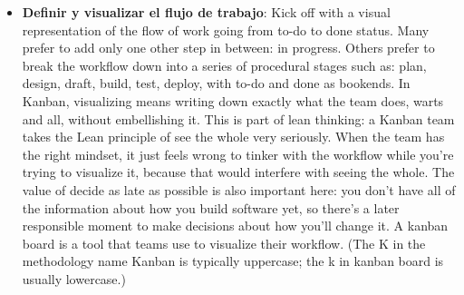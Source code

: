 \begin{itemize}
    \item \textbf{Definir y visualizar el flujo de trabajo}: %
    Kick off with a visual representation
    of the flow of work going from to-do to done status. Many
    prefer to add only one other step in between: in progress.
    Others prefer to break the workflow down into a series of
    procedural stages such as: plan, design, draft, build, test,
    deploy, with to-do and done as bookends.
    In Kanban, visualizing means writing down exactly what the team does, warts and all,
without embellishing it. This is part of lean thinking: a Kanban team takes the Lean
principle of see the whole very seriously. When the team has the right mindset, it just
feels wrong to tinker with the workflow while you're trying to visualize it, because that
would interfere with seeing the whole. The value of decide as late as possible is also
important here: you don't have all of the information about how you build software
yet, so there's a later responsible moment to make decisions about how you'll
change it. A kanban board is a tool that teams use to visualize their workflow. (The K in the
methodology name Kanban is typically uppercase; the k in kanban board is usually
lowercase.)


\end{itemize}
